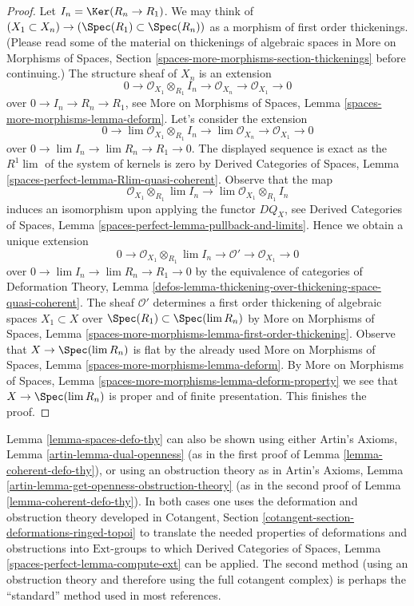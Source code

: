 \begin{proof}
\medskip\noindent
Let $I_n = \Ker(R_n \to R_1)$. We may think of
$(X_1 \subset X_n) \to (\Spec(R_1) \subset \Spec(R_n))$
as a morphism of first order thickenings. (Please read some of the material
on thickenings of algebraic spaces in More on Morphisms of
Spaces, Section \ref{spaces-more-morphisms-section-thickenings}
before continuing.) The structure sheaf of $X_n$ is an extension
$$
0 \to \mathcal{O}_{X_1} \otimes_{R_1} I_n \to
\mathcal{O}_{X_n} \to \mathcal{O}_{X_1} \to 0
$$
over $0 \to I_n \to R_n \to R_1$, see
More on Morphisms of Spaces, Lemma
\ref{spaces-more-morphisms-lemma-deform}.
Let's consider the extension
$$
0 \to \lim \mathcal{O}_{X_1} \otimes_{R_1} I_n \to
\lim \mathcal{O}_{X_n} \to \mathcal{O}_{X_1} \to 0
$$
over $0 \to \lim I_n \to \lim R_n \to R_1 \to 0$.
The displayed sequence is exact as the $R^1\lim$ of the system
of kernels is zero by Derived Categories of Spaces, Lemma
\ref{spaces-perfect-lemma-Rlim-quasi-coherent}.
Observe that the map
$$
\mathcal{O}_{X_1} \otimes_{R_1} \lim I_n \longrightarrow
\lim \mathcal{O}_{X_1} \otimes_{R_1} I_n
$$
induces an isomorphism upon applying the functor $DQ_X$, see
Derived Categories of Spaces, Lemma
\ref{spaces-perfect-lemma-pullback-and-limits}.
Hence we obtain a unique extension
$$
0 \to \mathcal{O}_{X_1} \otimes_{R_1} \lim I_n \to
\mathcal{O}' \to \mathcal{O}_{X_1} \to 0
$$
over $0 \to \lim I_n \to \lim R_n \to R_1 \to 0$
by the equivalence of categories of
Deformation Theory, Lemma
\ref{defos-lemma-thickening-over-thickening-space-quasi-coherent}.
The sheaf $\mathcal{O}'$ determines
a first order thickening of algebraic spaces $X_1 \subset X$
over $\Spec(R_1) \subset \Spec(\lim R_n)$
by More on Morphisms of Spaces, Lemma
\ref{spaces-more-morphisms-lemma-first-order-thickening}.
Observe that $X \to \Spec(\lim R_n)$ is flat by the already
used More on Morphisms of Spaces, Lemma
\ref{spaces-more-morphisms-lemma-deform}.
By More on Morphisms of Spaces, Lemma
\ref{spaces-more-morphisms-lemma-deform-property}
we see that $X \to \Spec(\lim R_n)$ is proper
and of finite presentation.
This finishes the proof.
\end{proof}

\begin{remark}
\label{remark-spaces-defo-thy}
Lemma \ref{lemma-spaces-defo-thy} can also be shown using either
Artin's Axioms, Lemma \ref{artin-lemma-dual-openness}
(as in the first proof of
Lemma \ref{lemma-coherent-defo-thy}), or using an obstruction theory
as in Artin's Axioms, Lemma \ref{artin-lemma-get-openness-obstruction-theory}
(as in the second proof of
Lemma \ref{lemma-coherent-defo-thy}).
In both cases one uses the deformation and obstruction theory developed in
Cotangent, Section \ref{cotangent-section-deformations-ringed-topoi}
to translate the needed properties of deformations and obstructions
into $\text{Ext}$-groups to which
Derived Categories of Spaces, Lemma
\ref{spaces-perfect-lemma-compute-ext}
can be applied.
The second method (using an obstruction theory and therefore
using the full cotangent complex) is perhaps the ``standard'' method used
in most references.
\end{remark}





